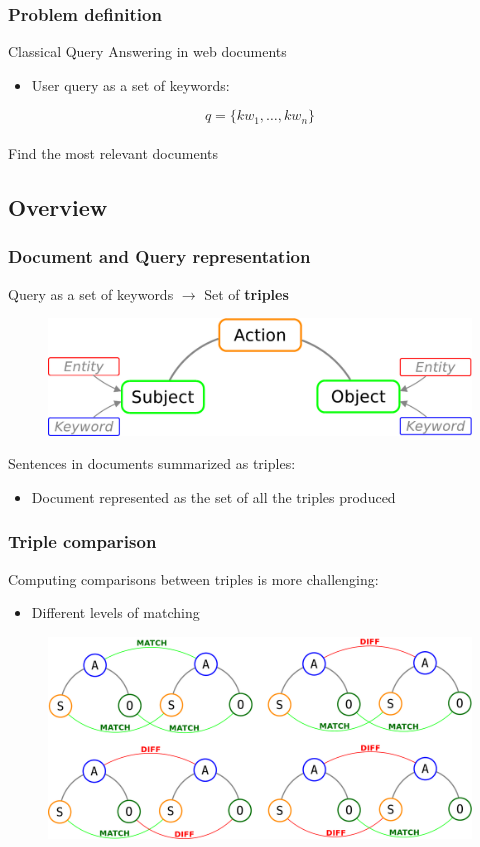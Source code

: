 \documentclass{beamer}
\begin{document}
\begin{frame}
\frametitle{Problem definition}
Classical Query Answering in web documents\\
\begin{itemize}
\item User query as a set of keywords:
\end{itemize}
\bigskip
\begin{equation*}
q = \{kw_{1}, \dots, kw_{n}\}
\end{equation*}
\\
\bigskip
Find the most relevant documents
\end{frame}

\subsection{Overview}

\begin{frame}
\frametitle{Document and Query representation}
Query as a set of keywords $\rightarrow$ Set of {\bfseries triples}\\
\smallskip
\begin{figure}
\includegraphics[scale=0.4]{imgs/triple}
\end{figure}
\medskip
Sentences in documents summarized as triples:
\begin{itemize}
\item Document represented as the set of all the triples produced
\end{itemize}
\end{frame}

\begin{frame}
\frametitle{Triple comparison}
Computing comparisons between triples is more challenging:
\begin{itemize}
\item Different levels of matching
\end{itemize}
\begin{figure}
\includegraphics[scale=0.3]{imgs/tricmp}
\end{figure}
\end{frame}
\end{document}
